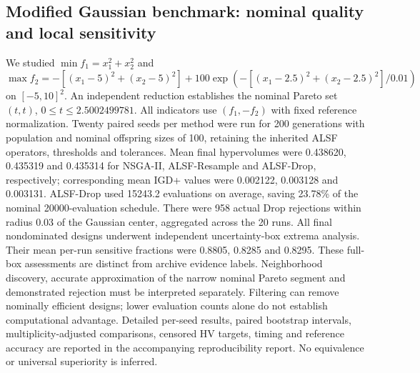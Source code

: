 \subsection{Modified Gaussian benchmark: nominal quality and local sensitivity}
We studied $\min f_1=x_1^2+x_2^2$ and $\max f_2=-[(x_1-5)^2+(x_2-5)^2]+100\exp(-[(x_1-2.5)^2+(x_2-2.5)^2]/0.01)$ on $[-5,10]^2$.
An independent reduction establishes the nominal Pareto set $(t,t)$, $0\le t\le 2.5002499781$. All indicators use $(f_1,-f_2)$ with fixed reference normalization.
Twenty paired seeds per method were run for 200 generations with population and nominal offspring sizes of 100, retaining the inherited ALSF operators, thresholds and tolerances.
Mean final hypervolumes were 0.438620, 0.435319 and 0.435314 for NSGA-II, ALSF-Resample and ALSF-Drop, respectively; corresponding mean IGD+ values were 0.002122, 0.003128 and 0.003131.
ALSF-Drop used 15243.2 evaluations on average, saving 23.78\% of the nominal 20000-evaluation schedule. There were 958 actual Drop rejections within radius 0.03 of the Gaussian center, aggregated across the 20 runs.
All final nondominated designs underwent independent uncertainty-box extrema analysis. Their mean per-run sensitive fractions were 0.8805, 0.8285 and 0.8295. These full-box assessments are distinct from archive evidence labels.
Neighborhood discovery, accurate approximation of the narrow nominal Pareto segment and demonstrated rejection must be interpreted separately. Filtering can remove nominally efficient designs; lower evaluation counts alone do not establish computational advantage. Detailed per-seed results, paired bootstrap intervals, multiplicity-adjusted comparisons, censored HV targets, timing and reference accuracy are reported in the accompanying reproducibility report. No equivalence or universal superiority is inferred.
